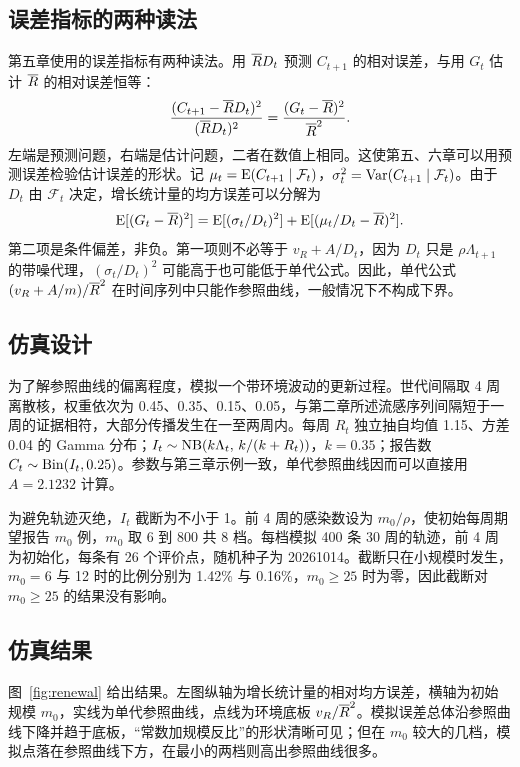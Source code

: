 \subsection{误差指标的两种读法}

第五章使用的误差指标有两种读法。用 $\overline{R} D_t$ 预测 $C_{t+1}$ 的相对误差，与用 $G_t$ 估计 $\overline{R}$ 的相对误差恒等：
\begin{equation}
  \frac{(C_{t+1}-\overline{R} D_t)^2}{(\overline{R} D_t)^2}=\frac{(G_t-\overline{R})^2}{\overline{R}^2}.
  \label{eq:identity}
\end{equation}
左端是预测问题，右端是估计问题，二者在数值上相同。这使第五、六章可以用预测误差检验估计误差的形状。记 $\mu_t=\operatorname{E}(C_{t+1}\mid\mathcal F_t)$，$\sigma_t^2=\operatorname{Var}(C_{t+1}\mid\mathcal F_t)$。由于 $D_t$ 由 $\mathcal F_t$ 决定，增长统计量的均方误差可以分解为
\begin{equation}
  \operatorname{E}[(G_t-\overline{R})^2]=\operatorname{E}[(\sigma_t/D_t)^2]+\operatorname{E}[(\mu_t/D_t-\overline{R})^2].
  \label{eq:mse-decomp}
\end{equation}
第二项是条件偏差，非负。第一项则不必等于 $v_R+A/D_t$，因为 $D_t$ 只是 $\rho\Lambda_{t+1}$ 的带噪代理，$(\sigma_t/D_t)^2$ 可能高于也可能低于单代公式。因此，单代公式 $(v_R+A/m)/\overline{R}^2$ 在时间序列中只能作参照曲线，一般情况下不构成下界。

\subsection{仿真设计}

为了解参照曲线的偏离程度，模拟一个带环境波动的更新过程。世代间隔取 4 周离散核，权重依次为 0.45、0.35、0.15、0.05，与第二章所述流感序列间隔短于一周的证据\citep{cowling2009estimation, vink2014serial}相符，大部分传播发生在一至两周内。每周 $R_t$ 独立抽自均值 1.15、方差 0.04 的 Gamma 分布；$I_t\sim\operatorname{NB}(k\Lambda_t,\,k/(k+R_t))$，$k=0.35$；报告数 $C_t\sim\operatorname{Bin}(I_t,0.25)$。参数与第三章示例一致，单代参照曲线因而可以直接用 $A=2.1232$ 计算。

为避免轨迹灭绝，$I_t$ 截断为不小于 1。前 4 周的感染数设为 $m_0/\rho$，使初始每周期望报告 $m_0$ 例，$m_0$ 取 6 到 800 共 8 档。每档模拟 400 条 30 周的轨迹，前 4 周为初始化，每条有 26 个评价点，随机种子为 20261014。截断只在小规模时发生，$m_0=6$ 与 12 时的比例分别为 1.42\% 与 0.16\%，$m_0\geq25$ 时为零，因此截断对 $m_0\ge25$ 的结果没有影响。

\subsection{仿真结果}

图~\ref{fig:renewal} 给出结果。左图纵轴为增长统计量的相对均方误差，横轴为初始规模 $m_0$，实线为单代参照曲线，点线为环境底板 $v_R/\overline{R}^2$。模拟误差总体沿参照曲线下降并趋于底板，“常数加规模反比”的形状清晰可见；但在 $m_0$ 较大的几档，模拟点落在参照曲线下方，在最小的两档则高出参照曲线很多。

